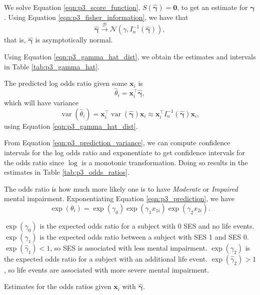 \documentclass[letterpaper,11pt]{article}
\begin{document}
\begin{enumerate}
\begin{description}
    We solve Equation \ref{eqn:p3_score_function},
    $S\left(\hat{\bm{\gamma}}\right) = \mathbf{0}$, to get an estimate for
    $\bm\gamma$. Using Equation \ref{eqn:p3_fisher_information}, we have that
    \begin{equation}
      \hat{\bm\gamma}
      \xrightarrow{\mathcal{D}}
      \mathcal{N}\left(
        \gamma,
        I_n^{-1}\left(\hat{\bm\gamma}\right)
      \right),
      \label{eqn:p3_gamma_hat_dist}
    \end{equation}
    that is, $\hat{\bm\gamma}$ is asymptotically normal.

    Using Equation \ref{eqn:p3_gamma_hat_dist}, we obtain the estimates and
    intervals in Table \ref{tab:p3_gamma_hat}.

    The predicted log odds ratio given some $\mathbf{x}_i$ is
    \begin{equation}
      \hat\theta_i = \mathbf{x}_i^\intercal\hat{\bm\gamma},
      \label{eqn:p3_prediction}
    \end{equation}
    which will have variance
    \begin{equation}
      \operatorname{var}\left(\hat\theta_i\right)
      = \mathbf{x}_i^\intercal\operatorname{var}\left(\hat{\bm\gamma}\right)
      \mathbf{x}_i
      \approx \mathbf{x}_i^\intercal I_n^{-1}\left(\hat{\bm\gamma}\right)
      \mathbf{x}_i,
      \label{eqn:p3_prediction_variance}
    \end{equation}
    using Equation \ref{eqn:p3_gamma_hat_dist}.

    From Equation \ref{eqn:p3_prediction_variance}, we can compute confidence
    intervals for the log odds ratio and exponentiate to get confidence
    intervals for the odds ratio since $\log$ is a monotonic
    transformation. Doing so results in the estimates in Table
    \ref{tab:p3_odds_ratios}.

    The odds ratio is how much more likely one is to have \emph{Moderate} or
    \emph{Impaired} mental impairment. Exponentiating Equation
    \ref{eqn:p3_prediction}, we have
    \begin{equation}
      \exp\left(\theta_i\right) =
      \exp\left(\gamma_0\right)
      \exp\left(\gamma_1x_{1i}\right)
      \exp\left(\gamma_2x_{2i}\right).
    \end{equation}
    
    $\exp\left(\gamma_0\right)$ is the expected odds ratio for a subject with
    $0$ SES and no life events. $\exp\left(\gamma_1\right)$ is the expected odds
    ratio between a subject with SES 1 and SES 0.
    $\exp\left(\hat{\gamma}_1\right) < 1$, so SES is associated with less mental
    impairment. $\exp\left(\gamma_2\right)$ is the expected odds ratio for a
    subject with an additional life event.
    $\exp\left(\hat{\gamma}_2\right) > 1$, so life events are associated with
    more severe mental impairment.
  \end{description}
  \begin{table}
    \scriptsize
    \centering
    
    \caption{Estimates for the odds ratios given $\mathbf{x}_i$ with
      $\hat{\bm\gamma}$.}
    \label{tab:p3_odds_ratios}
  \end{table}
  

\end{enumerate}
\end{document}
